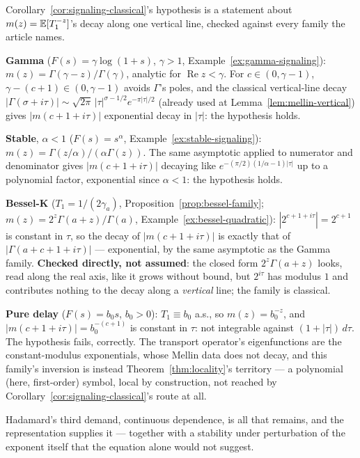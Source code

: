 \begin{remark}\label{rem:classical-families}
Corollary~\ref{cor:signaling-classical}'s hypothesis is a statement about
$m(z) = \mathbb{E}[T_1^{-z}]$'s decay along one vertical line, checked against every family the article
names.

\textbf{Gamma} ($F(s) = \gamma\log(1+s)$, $\gamma>1$, Example~\ref{ex:gamma-signaling}):
$m(z) = \Gamma(\gamma-z)/\Gamma(\gamma)$, analytic for $\operatorname{Re} z < \gamma$. For
$c \in (0,\gamma-1)$, $\gamma - (c+1) \in (0,\gamma-1)$ avoids $\Gamma$'s poles, and the classical
vertical-line decay $|\Gamma(\sigma+i\tau)| \sim \sqrt{2\pi}\,|\tau|^{\sigma-1/2}e^{-\pi|\tau|/2}$
(already used at Lemma~\ref{lem:mellin-vertical}) gives $|m(c+1+i\tau)|$ exponential decay in
$|\tau|$: the hypothesis holds.

\textbf{Stable}, $\alpha<1$ ($F(s)=s^\alpha$, Example~\ref{ex:stable-signaling}):
$m(z) = \Gamma(z/\alpha)/(\alpha\Gamma(z))$. The same asymptotic applied to numerator and
denominator gives $|m(c+1+i\tau)|$ decaying like $e^{-(\pi/2)(1/\alpha-1)|\tau|}$ up to a
polynomial factor, exponential since $\alpha<1$: the hypothesis holds.

\textbf{Bessel-K} ($T_1 = 1/(2\gamma_a)$, Proposition~\ref{prop:bessel-family};
$m(z) = 2^z\Gamma(a+z)/\Gamma(a)$, Example~\ref{ex:bessel-quadratic}):
$|2^{c+1+i\tau}| = 2^{c+1}$ is constant in $\tau$, so the decay of $|m(c+1+i\tau)|$ is exactly
that of $|\Gamma(a+c+1+i\tau)|$ --- exponential, by the same asymptotic as the Gamma family.
\textbf{Checked directly, not assumed}: the closed form $2^z\Gamma(a+z)$ looks, read along the
real axis, like it grows without bound, but $2^{i\tau}$ has modulus $1$ and contributes nothing to
the decay along a \emph{vertical} line; the family is classical.

\textbf{Pure delay} ($F(s)=b_0s$, $b_0>0$): $T_1 \equiv b_0$ a.s., so $m(z) = b_0^{-z}$, and
$|m(c+1+i\tau)| = b_0^{-(c+1)}$ is constant in $\tau$: not integrable against $(1+|\tau|)\,d\tau$.
The hypothesis fails, correctly. The transport operator's eigenfunctions are the constant-modulus
exponentials, whose Mellin data does not decay, and this family's inversion is instead
Theorem~\ref{thm:locality}'s territory --- a polynomial (here, first-order) symbol, local by
construction, not reached by Corollary~\ref{cor:signaling-classical}'s route at all.
\end{remark}

Hadamard's third demand, continuous dependence, is all that remains, and the
representation supplies it --- together with a stability under perturbation of the
exponent itself that the equation alone would not suggest.


